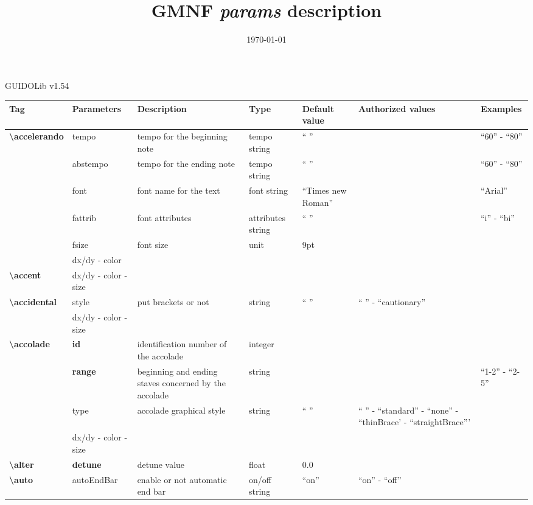 \documentclass[a4paper, landscape, 10pt]{article}
\makeatletter
\renewcommand{\maketitle}{
    \begin{center}
      \large
      {\LARGE\@title}
      \par\vspace{1ex}
      GUIDOLib v1.54
    \end{center}
}
\makeatother
\begin{document}
\title{GMNF \emph{params} description}
\date{\today}

\maketitle

\setlength{\parindent}{0pt}

\renewcommand{\tabularxcolumn}[1]{m{#1}}

\begin{tabularx}{\linewidth}{p{3cm}p{3cm}p{6cm}p{2.5cm}p{2.5cm}p{3.5cm}p{3.5cm}}
    \hline
    \textbf{Tag}&\textbf{Parameters}&\textbf{Description}&\textbf{Type}&\textbf{Default value}&\textbf{Authorized values}&\textbf{Examples}\\
    \hline
    \textbf{\textbackslash{}accelerando}&tempo&tempo for the beginning note&tempo string&`` ''&&``60'' - ``80''\\
    &abstempo&tempo for the ending note&tempo string&`` ''&&``60'' - ``80''\\
    &font&font name for the text&font string&``Times new Roman''&&``Arial''\\
    &fattrib&font attributes&attributes string&`` ''&&``i'' - ``bi''\\
    &fsize&font size&unit&9pt&&\\
    &dx/dy - color&&&&&\\
    \hline
    \textbf{\textbackslash{}accent}&dx/dy - color - size&&&&&\\
    \hline
    \textbf{\textbackslash{}accidental}&style&put brackets or not&string&`` ''&`` '' - ``cautionary''&\\
    &dx/dy - color - size&&&&&\\
    \hline
    \textbf{\textbackslash{}accolade}&\textbf{id}&identification number of the accolade&integer&&&\\
    &\textbf{range}&beginning and ending staves concerned by the accolade&string&&&``1-2'' - ``2-5''\\
    &type&accolade graphical style&string&`` ''&`` '' - ``standard'' - ``none'' - ``thinBrace' - ``straightBrace'''&\\
    &dx/dy - color - size&&&&&\\
    \hline
    \textbf{\textbackslash{}alter}&\textbf{detune}&detune value&float&0.0&&\\
    \hline
    \textbf{\textbackslash{}auto}&autoEndBar&enable or not automatic end bar&on/off string&``on''&``on'' - ``off''&\\

\end{tabularx}
\end{document}
